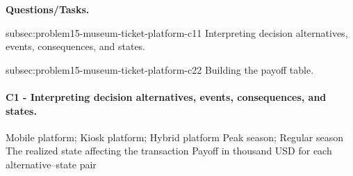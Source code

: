 	\textbf{Questions/Tasks.}
	\begin{enumerate}
	\CriterionTask
	{subsec:problem15-museum-ticket-platform-c1}{1}
	{Interpreting decision alternatives, events, consequences, and states.}

	\CriterionTask
	{subsec:problem15-museum-ticket-platform-c2}{2}
	{Building the payoff table.}
	\end{enumerate}

\paragraph*{C1 - Interpreting decision alternatives, events, consequences, and states.}
	\label{subsec:problem15-museum-ticket-platform-c1}
	\DecisionElementsTable
	{Mobile platform; Kiosk platform; Hybrid platform}
	{Peak season; Regular season}
	{The realized state affecting the transaction}
	{Payoff in thousand USD for each alternative--state pair}

